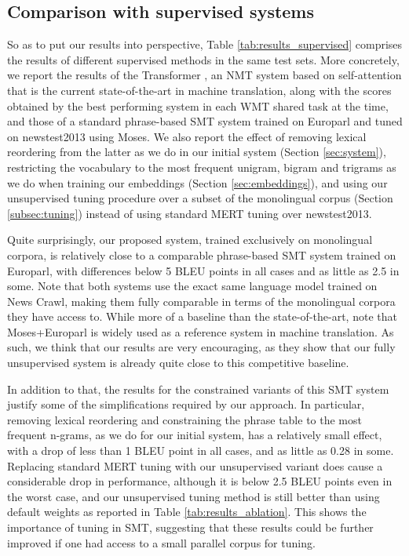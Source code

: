 \documentclass[11pt,a4paper]{article}
\begin{document}
\subsection{Comparison with supervised systems} \label{subsec:results_supervised}

So as to put our results into perspective, Table \ref{tab:results_supervised} comprises the results of different supervised methods in the same test sets. More concretely, we report the results of the Transformer \cite{vaswani2017attention}, an NMT system based on self-attention that is the current state-of-the-art in machine translation, along with the scores obtained by the best performing system in each WMT shared task at the time, and those of a standard phrase-based SMT system trained on Europarl and tuned on newstest2013 using Moses. We also report the effect of removing lexical reordering from the latter as we do in our initial system (Section \ref{sec:system}), restricting the vocabulary to the most frequent unigram, bigram and trigrams as we do when training our embeddings (Section \ref{sec:embeddings}), and using our unsupervised tuning procedure over a subset of the monolingual corpus (Section \ref{subsec:tuning}) instead of using standard MERT tuning over newstest2013.

Quite surprisingly, our proposed system, trained exclusively on monolingual corpora, is relatively close to a comparable phrase-based SMT system trained on Europarl, with differences below 5 BLEU points in all cases and as little as 2.5 in some. Note that both systems use the exact same language model trained on News Crawl, making them fully comparable in terms of the monolingual corpora they have access to. While more of a baseline than the state-of-the-art, note that Moses+Europarl is widely used as a reference system in machine translation. As such, we think that our results are very encouraging, as they show that our fully unsupervised system is already quite close to this competitive baseline.

In addition to that, the results for the constrained variants of this SMT system justify some of the simplifications required by our approach. In particular, removing lexical reordering and constraining the phrase table to the most frequent n-grams, as we do for our initial system, has a relatively small effect, with a drop of less than 1 BLEU point in all cases, and as little as 0.28 in some. Replacing standard MERT tuning with our unsupervised variant does cause a considerable drop in performance, although it is below 2.5 BLEU points even in the worst case, and our unsupervised tuning method is still better than using default weights as reported in Table \ref{tab:results_ablation}. This shows the importance of tuning in SMT, suggesting that these results could be further improved if one had access to a small parallel corpus for tuning.
\end{document}
